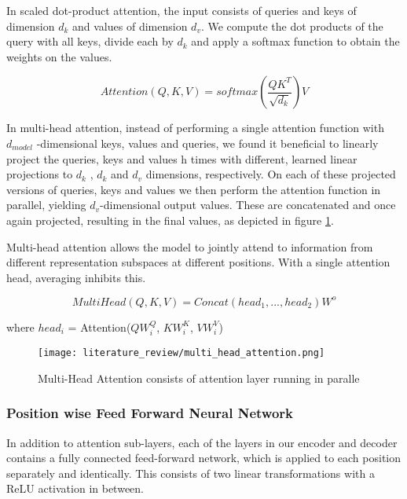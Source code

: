 In scaled dot-product attention, the input consists of queries and keys of dimension $d_k$ and values of dimension $d_v$. We compute the dot products of the query with all keys, divide each by $d_k$ and apply a softmax function to obtain the weights on the values.

\begin{equation}
    Attention(Q, K, V) = softmax(\frac{QK^{T}}{\sqrt{d_k}})V
\end{equation}


In multi-head attention, instead of performing a single attention function with $d_{model}$ -dimensional keys, values and queries, we found it beneficial to linearly project the queries, keys and values h times with different, learned linear projections to $d_k$ , $d_k$ and $d_v$ dimensions, respectively. On each of these projected versions of queries, keys and values we then perform the attention function in parallel, yielding $d_v$-dimensional
output values. These are concatenated and once again projected, resulting in the final values, as depicted in figure \ref{fig:Multi-Head Attention}.

Multi-head attention allows the model to jointly attend to information from different representation subspaces at different positions. With a single attention head, averaging inhibits this.

\begin{equation}
    MultiHead(Q, K, V) = Concat(head_1, ..., head_2)W^{o}
\end{equation}

\begin{center}
    where $head_i$ = Attention($QW_i^Q$, $KW_i^K$, $VW_i^V$)
\end{center}

\begin{figure}[H]
    \centering
    \texttt{[image: literature\_review/multi\_head\_attention.png]}
    \caption{Multi-Head Attention consists of attention layer running in paralle}
    \label{fig:Multi-Head Attention}
\end{figure}

\subsubsection{Position wise Feed Forward Neural Network}
In addition to attention sub-layers, each of the layers in our encoder and decoder contains a fully connected feed-forward network, which is applied to each position separately and identically. This consists of two linear transformations with a ReLU activation in between.

